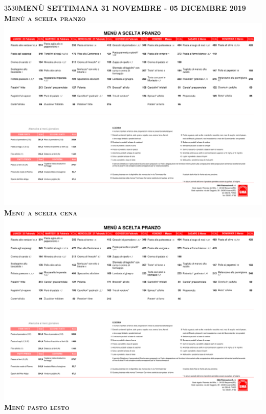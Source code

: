 \documentclass{article}
\makeatletter
\newcommand\HUGE{\@setfontsize\Huge{35}{30}}
\newcommand{\fraseuno}{MENÙ SETTIMANA 31 NOVEMBRE - 05 DICEMBRE 2019}
\makeatother
\begin{document}
%
\begin{center}
{\HUGE \color{red}\textbf{\fraseuno}}\\
\vspace{0.7cm}
{\Huge \textbf{\textsc{Menù a scelta pranzo}}}\\
\includegraphics[trim=0cm 16cm 0cm 2cm,clip,page=1,width=\textwidth,]{scelta.pdf}
\vspace{0.3cm}
{\Huge \textbf{\textsc{Menù a scelta cena}}}\\
\includegraphics[trim=0cm 17cm 0cm 2cm,clip,page=2,width=\textwidth,]{scelta.pdf}
\vspace{0.3cm}
{\Huge \textbf{\textsc{Menù pasto lesto}}}\\

\end{center}
\end{document}
